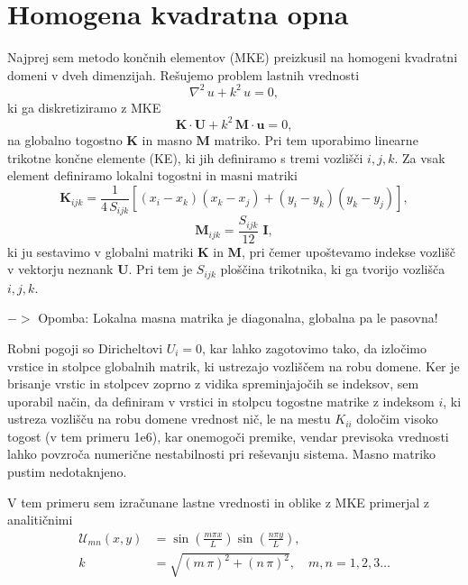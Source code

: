 
\section{Homogena kvadratna opna}

Najprej sem metodo končnih elementov (MKE) preizkusil na homogeni kvadratni domeni v dveh dimenzijah. Rešujemo problem lastnih vrednosti
\begin{equation}
    \nabla^2\,u + k^2\,u = 0,
\end{equation}
ki ga diskretiziramo z MKE
\begin{equation}
    \bm{K}\cdot\bm{U} + k^2\,\bm{M}\cdot\bm{u} =0,
\end{equation}
na globalno togostno $\bm{K}$ in masno $\bm{M}$ matriko. Pri tem uporabimo linearne trikotne končne elemente (KE), ki jih definiramo s tremi vozlišči $i,j,k$. Za vsak element definiramo lokalni togostni in masni matriki
\begin{equation}
    \bm{K}_{ijk} = \frac{1}{4\,S_{ijk}} \left[ (x_i - x_k)(x_k - x_j) + (y_i - y_k)(y_k - y_j) \right],
\end{equation}
\begin{equation}
    \bm{M}_{ijk} = \frac{S_{ijk}}{12} \; \bm{I},
\end{equation}
ki ju sestavimo v globalni matriki $\bm{K}$ in $\bm{M}$, pri čemer upoštevamo indekse vozlišč v vektorju neznank $\bm{U}$. Pri tem je $S_{ijk}$ ploščina trikotnika, ki ga tvorijo vozlišča $i,j,k$.

\noindent $->$ Opomba: Lokalna masna matrika je diagonalna, globalna pa le pasovna!

Robni pogoji so Diricheltovi $U_i = 0$, kar lahko zagotovimo tako, da izločimo vrstice in stolpce globalnih matrik, ki ustrezajo vozliščem na robu domene. Ker je brisanje vrstic in stolpcev zoprno z vidika spreminjajočih se indeksov, sem uporabil način, da definiram v vrstici in stolpcu togostne matrike z indeksom $i$, ki ustreza vozlišču na robu domene vrednost nič, le na mestu $K_{ii}$ določim visoko togost (v tem primeru 1e6), kar onemogoči premike, vendar previsoka vrednosti lahko povzroča numerične nestabilnosti pri reševanju sistema. Masno matriko pustim nedotaknjeno.

V tem primeru sem izračunane lastne vrednosti in oblike z MKE primerjal z analitičnimi
\begin{align}
    \mathcal{U}_{m n}(x,y) &= \sin\left(\frac{m\pi x}{L}\right)\sin\left(\frac{n\pi y}{L}\right), \\\nonumber
    k &= \sqrt{(m\,\pi)^2 + (n\,\pi)^2}, \quad m,n = 1,2,3\ldots
\end{align}

